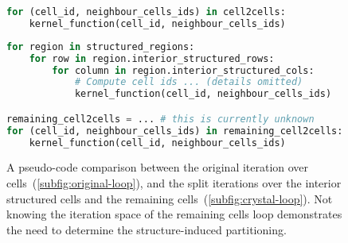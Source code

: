 \begin{figure}
\newsavebox{\firstlisting}
\begin{lrbox}{\firstlisting}
\begin{lstlisting}[language=python]
for (cell_id, neighbour_cells_ids) in cell2cells:
	kernel_function(cell_id, neighbour_cells_ids)
\end{lstlisting}
\end{lrbox}

\newsavebox{\secondlisting}
\begin{lrbox}{\secondlisting}
\begin{lstlisting}[language=python]
for region in structured_regions:
	for row in region.interior_structured_rows:
		for column in region.interior_structured_cols:
			# Compute cell ids ... (details omitted)
			kernel_function(cell_id, neighbour_cells_ids)

remaining_cell2cells = ... # this is currently unknown
for (cell_id, neighbour_cells_ids) in remaining_cell2cells:
	kernel_function(cell_id, neighbour_cells_ids)
\end{lstlisting}
\end{lrbox}

\sidebysideverticalnoncenter
{
\usebox{\firstlisting}
\caption{Applying a kernel function over the original cell-cell relation-map. Variable \lstinline|cell2cells| is the cell-cell relation-map.}
\label{subfig:original-loop}
}
{
\usebox{\secondlisting}
\caption{Applying a kernel function over the interior structured cells, followed by the remaining cells. Notice how no relation-map is required for the former loop. Variable \lstinline|remaining_cell2cells| is a presently unknown subset of the cell-cell relation-map which excludes interior structured cells. }
\label{subfig:crystal-loop}
}

\caption{A pseudo-code comparison between the original iteration over cells~(\ref{subfig:original-loop}), and the split iterations over the interior structured cells and the remaining cells~(\ref{subfig:crystal-loop}). Not knowing the iteration space of the remaining cells loop demonstrates the need to determine the structure-induced partitioning.}
\label{fig:comparing-loops}
\end{figure}



